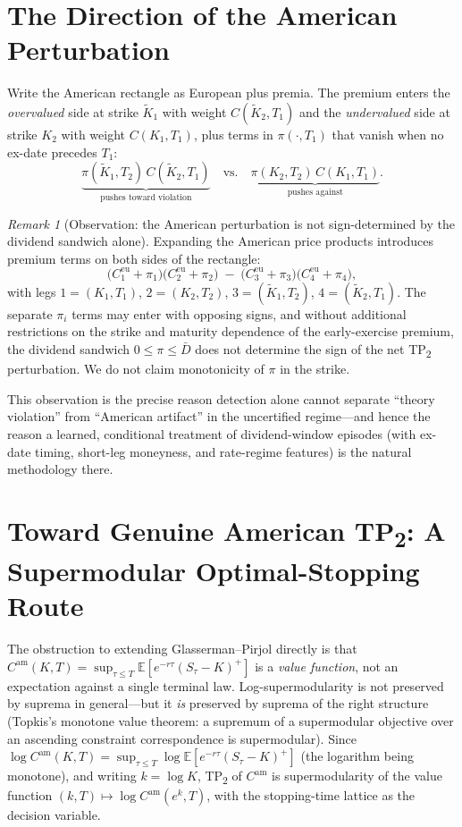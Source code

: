 \documentclass[11pt]{article}
\theoremstyle{remark}
\newtheorem{remark}{Remark}
\newcommand{\Cam}{C^{\mathrm{am}}}
\newcommand{\E}{\mathbb{E}}
\newcommand{\Kt}[1]{\tilde K_{#1}}
\begin{document}
\section{The Direction of the American Perturbation}\label{sec:direction}

Write the American rectangle as European plus premia. The premium enters the \emph{overvalued} side at strike $\Kt1$ with weight $C(\Kt2,T_1)$ and the \emph{undervalued} side at strike $K_2$ with weight $C(K_1,T_1)$, plus terms in $\pi(\cdot,T_1)$ that vanish when no ex-date precedes $T_1$:
\[
\underbrace{\pi(\Kt1,T_2)\,C(\Kt2,T_1)}_{\text{pushes toward violation}}
\quad\text{vs.}\quad
\underbrace{\pi(K_2,T_2)\,C(K_1,T_1)}_{\text{pushes against}} .
\]

\begin{remark}[Observation: the American perturbation is not sign-determined by the dividend sandwich alone]\label{prop:direction}
Expanding the American price products introduces premium terms on both sides of the rectangle:
\[
\big(C_1^{\mathrm{eu}}+\pi_1\big)\big(C_2^{\mathrm{eu}}+\pi_2\big)\;-\;\big(C_3^{\mathrm{eu}}+\pi_3\big)\big(C_4^{\mathrm{eu}}+\pi_4\big),
\]
with legs $1{=}(K_1,T_1)$, $2{=}(K_2,T_2)$, $3{=}(\Kt1,T_2)$, $4{=}(\Kt2,T_1)$. The separate $\pi_i$ terms may enter with opposing signs, and without additional restrictions on the strike and maturity dependence of the early-exercise premium, the dividend sandwich $0\le\pi\le\bar D$ does not determine the sign of the net TP\textsubscript{2} perturbation. We do not claim monotonicity of $\pi$ in the strike.
\end{remark}

This observation is the precise reason detection alone cannot separate ``theory violation'' from ``American artifact'' in the uncertified regime---and hence the reason a learned, conditional treatment of dividend-window episodes (with ex-date timing, short-leg moneyness, and rate-regime features) is the natural methodology there.

\section{Toward Genuine American TP\textsubscript{2}: A Supermodular Optimal-Stopping Route}\label{sec:topkis}

The obstruction to extending Glasserman--Pirjol directly is that $\Cam(K,T)=\sup_{\tau\le T}\E[e^{-r\tau}(S_\tau-K)^+]$ is a \emph{value function}, not an expectation against a single terminal law. Log-supermodularity is not preserved by suprema in general---but it \emph{is} preserved by suprema of the right structure (Topkis's monotone value theorem: a supremum of a supermodular objective over an ascending constraint correspondence is supermodular). Since $\log \Cam(K,T)=\sup_{\tau\le T}\log\E[e^{-r\tau}(S_\tau-K)^+]$ (the logarithm being monotone), and writing $k=\log K$, TP\textsubscript{2} of $\Cam$ is supermodularity of the value function $(k,T)\mapsto\log \Cam(e^k,T)$, with the stopping-time lattice as the decision variable.
\end{document}
